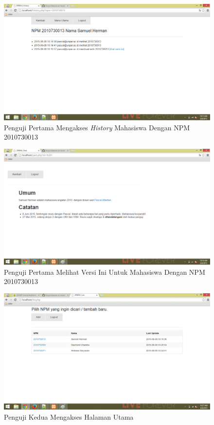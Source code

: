 \begin{figure}[p]
\centering
\includegraphics[scale=0.44]{Gambar/eks3.png}
\caption[Penguji Pertama Mengakses {\it History} Mahasiswa Dengan NPM 2010730013]{Penguji Pertama Mengakses {\it History} Mahasiswa Dengan NPM 2010730013} 
\label{fig:eks3}
\end{figure}

\begin{figure}[p]
\centering
\includegraphics[scale=0.44]{Gambar/eks4.png}
\caption[Penguji Pertama Melihat Versi Ini Untuk Mahasiswa Dengan NPM 2010730013]{Penguji Pertama Melihat Versi Ini Untuk Mahasiswa Dengan NPM 2010730013} 
\label{fig:eks4}
\end{figure}

\begin{figure}[p]
\centering
\includegraphics[scale=0.44]{Gambar/eks5.png}
\caption[Penguji Kedua Mengakses Halaman Utama]{Penguji Kedua Mengakses Halaman Utama} 
\label{fig:eks5}
\end{figure}

